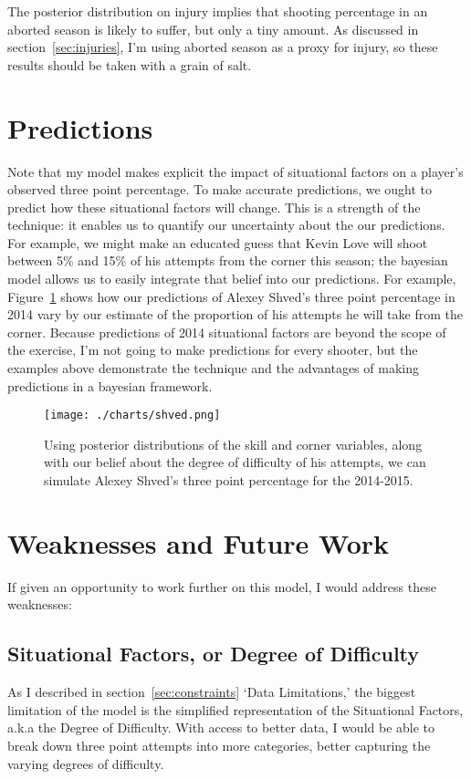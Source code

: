 \documentclass[11pt, oneside]{article}   	%
\begin{document}
The posterior distribution on injury implies that shooting percentage in an aborted season is likely to suffer, but only a tiny amount.  As discussed in section~\ref{sec:injuries}, I'm using aborted season as a proxy for injury, so these results should be taken with a grain of salt. 


\section{Predictions}

Note that my model makes explicit the impact of situational factors on a player's observed three point percentage.  To make accurate predictions, we ought to predict how these situational factors will change.  This is a strength of the technique:  it enables us to quantify our uncertainty about the our predictions.  For example, we might make an educated guess that Kevin Love will shoot between 5\% and 15\% of his attempts from the corner this season; the bayesian model allows us to easily integrate that belief into our predictions.  For example, Figure~\ref{fig:shved} shows how our predictions of Alexey Shved's three point percentage in 2014 vary by our estimate of the proportion of his attempts he will take from the corner.  
Because predictions of 2014 situational factors are beyond the scope of the exercise, I'm not going to make predictions for every shooter, but the examples above demonstrate the technique and the advantages of making predictions in a bayesian framework. 

\begin{figure}[h!]
 \centering
      \texttt{[image: ./charts/shved.png]}
  \caption{Using posterior distributions of the skill and corner variables, along with our belief about the degree of difficulty of his attempts, we can simulate Alexey Shved's three point percentage for the 2014-2015.   }
  \label{fig:shved}
\end{figure}



\section{Weaknesses and Future Work}

If given an opportunity to work further on this model, I would address these weaknesses:

\subsection{Situational Factors, or Degree of Difficulty}
\label{sec:sitfac}
As I described in section~\ref{sec:constraints} `Data Limitations,' the biggest limitation of the model is the simplified representation of the Situational Factors, a.k.a the Degree of Difficulty.  With access to better data, I would be able to break down three point attempts into more categories, better capturing the varying degrees of difficulty.  
\end{document}
